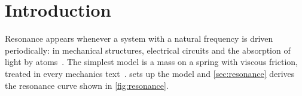 \section{Introduction}\label{sec:intro}
Resonance appears whenever a system with a natural frequency is driven periodically: in mechanical
structures, electrical circuits and the absorption of light by atoms~\cite{French1971}. The
simplest model is a mass on a spring with viscous friction, treated in every mechanics
text~\cite{Taylor2005,Landau1976}.  sets up the model and \cref{sec:resonance}
derives the resonance curve shown in \cref{fig:resonance}.
